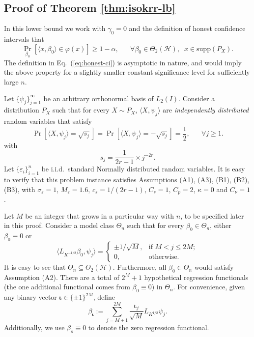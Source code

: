 \documentclass[11pt,a4paper]{article}
\newcommand{\vct}{\boldsymbol}
\theoremstyle{definition}
\theoremstyle{plain}
\theoremstyle{remark}
\newcommand{\supp}{\mathrm{supp}}
\newcommand{\mH}{\mathcal H}
\newcommand{\pd}[1]{
	{ \color{blue} PD: #1}
}
\begin{document}


\subsection{Proof of Theorem \ref{thm:isokrr-lb}}

In this lower bound we work with $\gamma_0=0$ and the definition of honest confidence intervals that
$$
\Pr_{\beta_0}[\langle x,\beta_0\rangle\in\varphi(x)] \geq 1-\alpha,\;\;\;\;\;\;\forall \beta_0\in\Theta_2(\mH),\;\;x\in\supp(P_X).
$$
The definition in Eq.~(\ref{eq:honest-ci}) is asymptotic in nature, and would imply the above property for a slightly smaller constant significance level for sufficiently large $n$.

Let $\{\psi_j\}_{j=1}^{\infty}$ be an arbitrary orthonormal basis of $L_2(I)$.
Consider a distribution $P_X$ such that for every $X\sim P_X$, $\langle X,\psi_j\rangle$ are \emph{independently distributed} random variables that satisfy
$$
\Pr[\langle X,\psi_j\rangle = \sqrt{s_j}] = \Pr[\langle X,\psi_j\rangle = -\sqrt{s_j}] = \frac{1}{2},\;\;\;\;\;\;\forall j\geq 1.
$$
with
$$
s_j = \frac{1}{2r-1}\times j^{-2r}.
$$
Let $\{\varepsilon_i\}_{i=1}^n$ be i.i.d.~standard Normally distributed random variables. It is easy to verify that this problem instance satisfies Assumptions (A1), (A3), (B1), (B2), (B3),
with $\sigma_\varepsilon=1$, $M_\varepsilon=1.6$, $c_s=1/(2r-1)$, $C_s=1$, $C_p=2$, $\kappa=0$ and $C_\nu=1$.

Let $M$ be an integer that grows in a particular way with $n$, to be specified later in this proof. 
Consider a model class $\Theta_n$ such that for every $\beta_0\in\Theta_n$, either $\beta_0\equiv 0$ or
$$
\langle L_{K^{-1/2}}\beta_0, \psi_j\rangle = \left\{\begin{array}{ll} \pm 1/\sqrt{M},& \text{if }M< j\leq 2M;\\ 0,& \text{otherwise}.\end{array}\right.
$$
It is easy to see that $\Theta_n\subseteq\Theta_2(\mH)$. Furthermore, all $\beta_0\in\Theta_n$ would satisfy Assumption (A2).
There are a total of $2^M+1$ hypothetical regression functionals (the one additional functional comes from $\beta_0\equiv 0$) in $\Theta_n$.
For convenience, given any binary vector $\vct\iota\in\{\pm 1\}^{2M}$, define
$$
\beta_{\vct\iota} := \sum_{j=M+1}^{2M}\frac{\vct\iota_j}{\sqrt{M}} L_{K^{1/2}}\psi_j.
$$
Additionally, we use $\beta_o\equiv 0$ to denote the zero regression functional.
\end{document}
